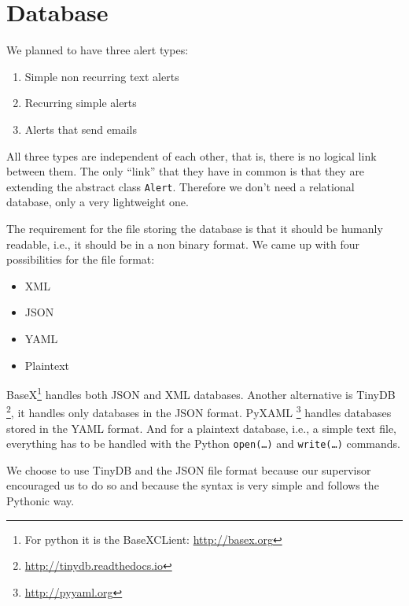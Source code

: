 \section{Database}

We planned to have three alert types:

\begin{enumerate}
    \item Simple non recurring text alerts
    \item Recurring simple alerts
    \item Alerts that send emails
\end{enumerate}

All three types are independent of each other, that is, there is no logical link
between them. The only ``link'' that they have in common is that they are
extending the abstract class \texttt{Alert}. Therefore we don't need a
relational database, only a very lightweight one.

The requirement for the file storing the database is that it should be humanly
readable, i.e., it should be in a non binary format. We came up with four
possibilities for the file format:

\begin{itemize}
    \item XML
    \item JSON
    \item YAML
    \item Plaintext
\end{itemize}

BaseX\footnote{For python it is the BaseXCLient:
\url{http://basex.org}} handles both JSON and XML databases. Another
alternative is TinyDB
\footnote{\url{http://tinydb.readthedocs.io}}, it
handles only databases in the JSON format. PyXAML
\footnote{\url{http://pyyaml.org}} handles databases stored in the
YAML
format. And for a plaintext database, i.e., a simple text file, everything has
to be handled with the Python \texttt{open(\ldots)} and \texttt{write(\ldots)}
commands.

We choose to use TinyDB and the JSON file format because our supervisor
encouraged us to do so and because the syntax is very simple and follows the
Pythonic way.
